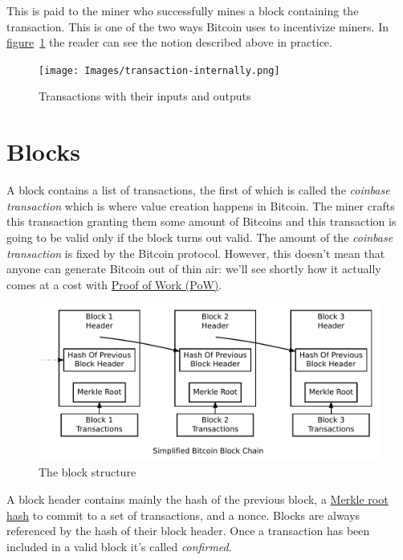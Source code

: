 This is paid to the miner who successfully mines a block containing the transaction. This is one of the two ways Bitcoin uses to incentivize miners. In \hyperref[fig:transaction-internally]{figure}~\ref{fig:transaction-internally} the reader can see the notion described above in practice.

\begin{figure}[ht]
  \centering
  \texttt{[image: Images/transaction-internally.png]}
  \caption{Transactions with their inputs and outputs~\cite{mastering}}
  \label{fig:transaction-internally}
\end{figure}

\section{\label{sec:blocks}Blocks}
A block contains a list of transactions, the first of which is called the \emph{coinbase transaction} which is where value creation happens in Bitcoin. The miner crafts this transaction granting them some amount of Bitcoins and this transaction is going to be valid only if the block turns out valid. The amount of the \emph{coinbase transaction} is fixed by the Bitcoin protocol. However, this doesn't mean that anyone can generate Bitcoin out of thin air: we'll see shortly how it actually comes at a cost with \hyperref[proofOfWork]{Proof of Work (PoW)}.

\begin{figure}[bh]
  \centering
  \includegraphics[width=0.9\columnwidth,keepaspectratio]{Images/block-structure.pdf}
  \caption{The block structure~\cite{Nakamoto_bitcoin:a}}
  \label{fig:block-structure}
\end{figure}
\pagebreak

A block header contains mainly the hash of the previous block, a \hyperref[sec:merkle-trees]{Merkle root hash} to commit to a set of transactions, and a nonce. Blocks are always referenced by the hash of their block header. Once a transaction has been included in a valid block it's called \emph{confirmed}.

